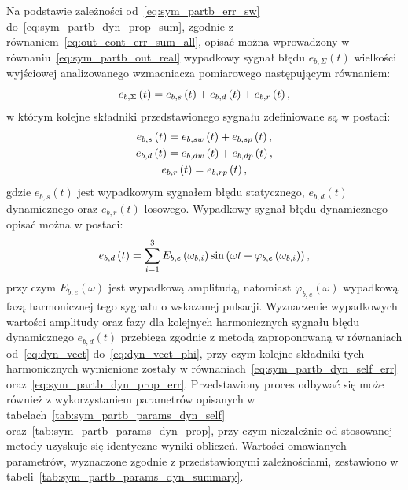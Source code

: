 Na podstawie zależności od~\eqref{eq:sym_partb_err_sw} do~\eqref{eq:sym_partb_dyn_prop_sum}, zgodnie z równaniem~\eqref{eq:out_cont_err_sum_all}, opisać można wprowadzony w równaniu~\eqref{eq:sym_partb_out_real} wypadkowy sygnał błędu $e_{b,\Sigma}(t)$ wielkości wyjściowej analizowanego wzmacniacza pomiarowego następującym równaniem:
\begin{equation}
e_{b,\Sigma} \left(t\right) = e_{b,s} \left(t\right) + e_{b,d} \left(t\right) + e_{b,r} \left(t\right) \label{eq:sym_partb_error_sum},
\end{equation}
w którym kolejne składniki przedstawionego sygnału zdefiniowane są w postaci:
\begin{gather}
e_{b,s} \left(t\right) = e_{b,sw} \left(t\right) + e_{b,sp} \left(t\right) \label{eq:sym_partb_error_stat}, \\
e_{b,d} \left(t\right) = e_{b,dw} \left(t\right) + e_{b,dp} \left(t\right) \label{eq:sym_partb_error_dyn}, \\
e_{b,r} \left(t\right) = e_{b,rp} \left(t\right) \label{eq:sym_partb_error_rand},
\end{gather}
gdzie $e_{b,s}(t)$ jest wypadkowym sygnałem błędu statycznego, $e_{b,d}(t)$ dynamicznego oraz $e_{b,r}(t)$ losowego. Wypadkowy sygnał błędu dynamicznego opisać można w postaci:
\begin{equation}
e_{b,d} \left(t\right) = \sum _{i=1} ^{3} E_{b,e} \left(\omega_{b,i}\right) \sin \left(\omega t + \varphi_{b,e} \left(\omega_{b,i}\right)\right) \label{sym_partb_error_dyn_sum},
\end{equation}
przy czym $E_{b,e}(\omega)$ jest wypadkową amplitudą, natomiast $\varphi_{b,e}(\omega)$ wypadkową fazą harmonicznej tego sygnału o wskazanej pulsacji. Wyznaczenie wypadkowych wartości amplitudy oraz fazy dla kolejnych harmonicznych sygnału błędu dynamicznego $e_{b,d}(t)$ przebiega zgodnie z metodą zaproponowaną w równaniach od~\eqref{eq:dyn_vect} do~\eqref{eq:dyn_vect_phi}, przy czym kolejne składniki tych harmonicznych wymienione zostały w równaniach~\eqref{eq:sym_partb_dyn_self_err} oraz~\eqref{eq:sym_partb_dyn_prop_err}. Przedstawiony proces odbywać się może również z wykorzystaniem parametrów opisanych w tabelach~\ref{tab:sym_partb_params_dyn_self} oraz~\ref{tab:sym_partb_params_dyn_prop}, przy czym niezależnie od stosowanej metody uzyskuje się identyczne wyniki obliczeń. Wartości omawianych parametrów, wyznaczone zgodnie z przedstawionymi zależnościami, zestawiono w tabeli~\ref{tab:sym_partb_params_dyn_summary}.

